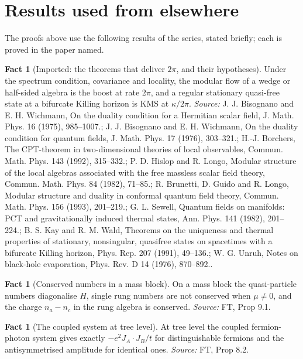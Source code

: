 \documentclass[11pt]{article}
\theoremstyle{definition}
\newtheorem{fact}[theorem]{Fact}
\theoremstyle{plain}
\begin{document}
\section{Results used from elsewhere}
The proofs above use the following results of the series, stated briefly; each is proved in the paper named.

\begin{fact}[Imported: the theorems that deliver $2\pi$, and their hypotheses]\label{c:angle.imported-theorems-deliver-their-hypotheses}
Under the spectrum condition, covariance and locality, the modular flow of a wedge or half-sided algebra is the boost at rate $2\pi$, and a regular stationary quasi-free state at a bifurcate Killing horizon is KMS at $\kappa/2\pi$.
\emph{Source:} J. J. Bisognano and E. H. Wichmann, On the duality condition for a Hermitian scalar field, J. Math. Phys. 16 (1975), 985--1007.; J. J. Bisognano and E. H. Wichmann, On the duality condition for quantum fields, J. Math. Phys. 17 (1976), 303--321.; H.-J. Borchers, The CPT-theorem in two-dimensional theories of local observables, Commun. Math. Phys. 143 (1992), 315--332.; P. D. Hislop and R. Longo, Modular structure of the local algebras associated with the free massless scalar field theory, Commun. Math. Phys. 84 (1982), 71--85.; R. Brunetti, D. Guido and R. Longo, Modular structure and duality in conformal quantum field theory, Commun. Math. Phys. 156 (1993), 201--219.; G. L. Sewell, Quantum fields on manifolds: PCT and gravitationally induced thermal states, Ann. Phys. 141 (1982), 201--224.; B. S. Kay and R. M. Wald, Theorems on the uniqueness and thermal properties of stationary, nonsingular, quasifree states on spacetimes with a bifurcate Killing horizon, Phys. Rep. 207 (1991), 49--136.; W. G. Unruh, Notes on black-hole evaporation, Phys. Rev. D 14 (1976), 870--892..
\end{fact}

\begin{fact}[Conserved numbers in a mass block]\label{c:field-theory.conserved-numbers-mass-block}
On a mass block the quasi-particle numbers diagonalise $H$, single rung numbers are not conserved when $\mu \neq 0$, and the charge $n_a - n_c$ in the rung algebra is conserved.
\emph{Source:} FT, Prop 9.1.
\end{fact}

\begin{fact}[The coupled system at tree level]\label{c:field-theory.coupled-system-tree-level}
At tree level the coupled fermion-photon system gives exactly $-e^2J_A\cdot J_B/t$ for distinguishable fermions and the antisymmetrised amplitude for identical ones.
\emph{Source:} FT, Prop 8.2.
\end{fact}
\end{document}
